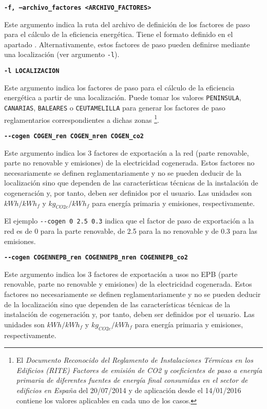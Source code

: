 \documentclass[10pt,notitlepage,oneside,a4paper]{article}
\begin{document}
\textbf{\texttt{-f, --archivo\_factores <ARCHIVO\_FACTORES>}}

Este argumento indica la ruta del archivo de definición de los factores de paso para el cálculo de la eficiencia energética. Tiene el formato definido en el apartado .
Alternativamente, estos factores de paso pueden definirse mediante una localización (ver argumento \texttt{-l}).

\textbf{\texttt{-l LOCALIZACION}}

Este argumento indica los factores de paso para el cálculo de la eficiencia energética a partir de una localización. Puede tomar los valores \texttt{PENINSULA}, \texttt{CANARIAS}, \texttt{BALEARES} o \texttt{CEUTAMELILLA} para generar los factores de paso reglamentarios correspondientes a dichas zonas \footnote{El \textit{Documento Reconocido del Reglamento de Instalaciones Térmicas en los Edificios (RITE) Factores de emisión de CO2 y coeficientes de paso a energía primaria de diferentes fuentes de energía final consumidas en el sector de edificios en España} del 20/07/2014 y de aplicación desde el 14/01/2016 contiene los valores aplicables en cada uno de los casos.}.

%

\textbf{\texttt{-{}-cogen COGEN\_ren COGEN\_nren COGEN\_co2}}

Este argumento indica los 3 factores de exportación a la red (parte renovable, parte no renovable y emisiones) de la electricidad cogenerada. Estos factores no necesariamente se definen reglamentariamente y no se pueden deducir de la localización sino que dependen de las características técnicas de la instalación de cogeneración y, por tanto, deben ser definidos por el usuario. Las unidades son $kWh/kWh_f$ y $kg_{CO2e}/kWh_f$ para energía primaria y emisiones, respectivamente.

El ejemplo \texttt{-{}-cogen 0 2.5 0.3} indica que el factor de paso de exportación a la red es de 0 para la parte renovable, de 2.5 para la no renovable y de 0.3 para las emisiones.

\textbf{\texttt{-{}-cogen COGENNEPB\_ren COGENNEPB\_nren COGENNEPB\_co2}}

Este argumento indica los 3 factores de exportación a usos no EPB (parte renovable, parte no renovable y emisiones) de la electricidad cogenerada. Estos factores no necesariamente se definen reglamentariamente y no se pueden deducir de la localización sino que dependen de las características técnicas de la instalación de cogeneración y, por tanto, deben ser definidos por el usuario. Las unidades son $kWh/kWh_f$ y $kg_{CO2e}/kWh_f$ para energía primaria y emisiones, respectivamente.
\end{document}
